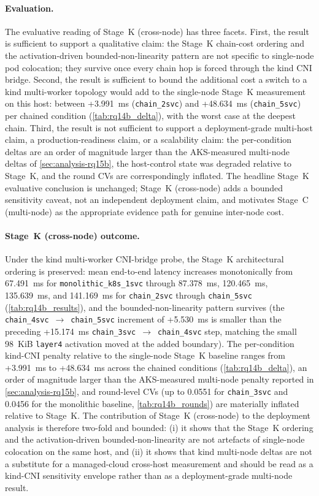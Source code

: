 \paragraph{Evaluation.}
The evaluative reading of Stage~K (cross-node) has three facets. First, the
result is sufficient to support a qualitative claim: the Stage~K
chain-cost ordering and the activation-driven bounded-non-linearity
pattern are not specific to single-node pod colocation; they
survive once every chain hop is forced through the kind CNI bridge.
Second, the result is sufficient to bound the additional cost a
switch to a kind multi-worker topology would add to the single-node
Stage~K measurement on this host: between +3.991~ms
(\texttt{chain\_2svc}) and +48.634~ms (\texttt{chain\_5svc}) per
chained condition (\cref{tab:rq14b_delta}), with the worst case at
the deepest chain.
Third, the result is not sufficient to support a deployment-grade
multi-host claim, a production-readiness claim, or a scalability
claim: the per-condition deltas are an order of magnitude larger
than the AKS-measured multi-node deltas of
\cref{sec:analysis-rq15b}, the host-control state was degraded
relative to Stage~K, and the round CVs are correspondingly inflated.
The headline Stage~K evaluative conclusion is unchanged; Stage~K (cross-node) adds
a bounded sensitivity caveat, not an independent deployment claim,
and motivates Stage~C (multi-node) as the appropriate evidence path for genuine
inter-node cost.

\paragraph{Stage~K (cross-node) outcome.}
Under the kind multi-worker CNI-bridge probe, the Stage~K
architectural ordering is preserved: mean end-to-end latency
increases monotonically from 67.491~ms for
\texttt{monolithic\_k8s\_1svc} through 87.378~ms, 120.465~ms,
135.639~ms, and 141.169~ms for \texttt{chain\_2svc} through
\texttt{chain\_5svc} (\cref{tab:rq14b_results}), and the
bounded-non-linearity pattern survives (the
\texttt{chain\_4svc}~$\rightarrow$~\texttt{chain\_5svc} increment of
+5.530~ms is smaller than the preceding +15.174~ms
\texttt{chain\_3svc}~$\rightarrow$~\texttt{chain\_4svc} step,
matching the small 98~KiB \texttt{layer4} activation moved at the
added boundary). The per-condition kind-CNI penalty relative to the
single-node Stage~K baseline ranges from +3.991~ms to +48.634~ms
across the chained conditions (\cref{tab:rq14b_delta}), an order of
magnitude larger than the AKS-measured multi-node penalty reported
in \cref{sec:analysis-rq15b}, and round-level CVs (up to 0.0551 for
\texttt{chain\_3svc} and 0.0456 for the monolithic baseline,
\cref{tab:rq14b_rounds}) are materially inflated relative to Stage~K.
The contribution of Stage~K (cross-node) to the deployment analysis is therefore
two-fold and bounded: (i) it shows that the Stage~K ordering and the
activation-driven bounded-non-linearity are not artefacts of
single-node colocation on the same host, and (ii) it shows that
kind multi-node deltas are not a substitute for a managed-cloud
cross-host measurement and should be read as a kind-CNI sensitivity
envelope rather than as a deployment-grade multi-node result.
